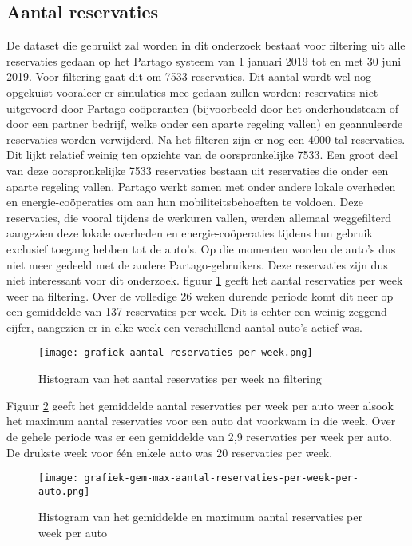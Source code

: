 \subsection{Aantal reservaties}
De dataset die gebruikt zal worden in dit onderzoek bestaat voor filtering uit alle reservaties gedaan op het Partago systeem van 1 januari 2019 tot en met 30 juni 2019. Voor filtering gaat dit om 7533 reservaties. Dit aantal wordt wel nog opgekuist vooraleer er simulaties mee gedaan zullen worden: reservaties niet uitgevoerd door Partago-coöperanten (bijvoorbeeld door het onderhoudsteam of door een partner bedrijf, welke onder een aparte regeling vallen) en geannuleerde reservaties worden verwijderd. Na het filteren zijn er nog een 4000-tal reservaties. Dit lijkt relatief weinig ten opzichte van de oorspronkelijke 7533. Een groot deel van deze oorspronkelijke 7533 reservaties bestaan uit reservaties die onder een aparte regeling vallen. Partago werkt samen met onder andere lokale overheden en energie-coöperaties om aan hun mobiliteitsbehoeften te voldoen. Deze reservaties, die vooral tijdens de werkuren vallen, werden allemaal weggefilterd aangezien deze lokale overheden en energie-coöperaties tijdens hun gebruik exclusief toegang hebben tot de auto's. Op die momenten worden de auto's dus niet meer gedeeld met de andere Partago-gebruikers. Deze reservaties zijn dus niet interessant voor dit onderzoek.
figuur \ref{grafiek:aantal-reservaties-per-week} geeft het aantal reservaties per week weer na filtering. Over de volledige 26 weken durende periode komt dit neer op een gemiddelde van 137 reservaties per week. Dit is echter een weinig zeggend cijfer, aangezien er in elke week een verschillend aantal auto's actief was. 
\begin{figure}[p]
	\texttt{[image: grafiek-aantal-reservaties-per-week.png]}
	\caption[Aantal reservaties per week]{Histogram van het aantal reservaties per week na filtering}
	\label{grafiek:aantal-reservaties-per-week}
\end{figure}
Figuur \ref{grafiek:aantal-reservaties-per-week-per-auto} geeft het gemiddelde aantal reservaties per week per auto weer alsook het maximum aantal reservaties voor een auto dat voorkwam in die week. Over de gehele periode was er een gemiddelde van 2,9 reservaties per week per auto. De drukste week voor één enkele auto was 20 reservaties per week. 
\begin{figure}[p]
	\texttt{[image: grafiek-gem-max-aantal-reservaties-per-week-per-auto.png]}
	\caption[Gemiddelde en maximum per week per auto]{Histogram van het gemiddelde en maximum aantal reservaties per week per auto}
	\label{grafiek:aantal-reservaties-per-week-per-auto}
\end{figure}

